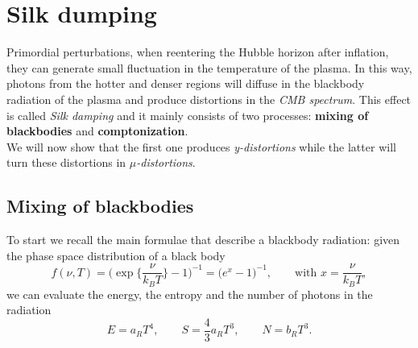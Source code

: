 \section{Silk dumping}
Primordial perturbations, when reentering the Hubble horizon after inflation, they can generate small fluctuation in the temperature of the plasma. In this way, photons from the hotter and denser regions will diffuse in the blackbody radiation of the plasma and produce distortions in the \emph{CMB spectrum}. This effect is called \emph{Silk damping} and it mainly consists of two processes: \textbf{mixing of blackbodies} and \textbf{comptonization}.\\ We will now show that the first one produces \emph{y-distortions} while the latter will turn these distortions in \emph{$\mu$-distortions}.
\subsection{Mixing of blackbodies}\label{sec:MixingOfBlackbodies}
To start we recall the main formulae that describe a blackbody radiation: given the phase space distribution of a black body
$$f(\nu,T)=\bigg(\exp\bigg\{\frac{\nu}{k_BT}\bigg\}-1\bigg)^{-1}=\bigg(e^x-1\bigg)^{-1},\qquad \text{with }x=\frac{\nu}{k_BT},$$
we can evaluate the energy, the entropy and the number of photons in the radiation $$E=a_{R}T^4,\qquad S=\frac{4}{3}a_RT^3,\qquad N=b_{R}T^3.$$